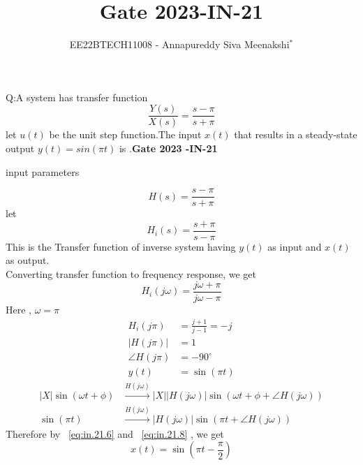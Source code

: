 \documentclass[journal,12pt,twocolumn]{IEEEtran}
\newcommand{\system}[1]{\stackrel{#1}{\rightarrow}}
\theoremstyle{remark}
\begin{document}

\vspace{3cm}

\title{Gate 2023-IN-21}
\author{EE22BTECH11008 - Annapureddy Siva Meenakshi$^{*}$%
}
\maketitle
\bigskip

\renewcommand{\thefigure}{\theenumi}
\renewcommand{\thetable}{\theenumi}
Q:A system has transfer function
 \[\frac{Y(s)}{X(s)}=\frac {s-\pi}{s+\pi}\]
 let $u(t)$ be the unit step function.The input $x(t)$ that results in a steady-state output $y(t)=sin(\pi t)$ is \underline{\quad}.\quad \textbf{Gate 2023 -IN-21}\\
\solution
\begin{table}[!ht]
    \centering
        
    \caption{input parameters}
    \label{tab:in_21_t1}
\end{table}
 \begin{equation}
     H(s)=\frac{s-\pi}{s+\pi}
 \end{equation} 
 let 
 \begin{equation}
     H_i(s)=\frac{s+\pi}{s-\pi}
 \end{equation} 
 This is the Transfer function of inverse system having $y(t)$ as input and $x(t)$ as output.\\
 Converting transfer function to frequency response, we get
 \begin{equation}
     H_i(j\omega)=\frac{j\omega+\pi}{j\omega-\pi}
 \end{equation}
 Here , $\omega=\pi$
 \begin{align}
    H_i(j\pi)&=\frac{j+1}{j-1}=-j\\
     |H(j\pi)|&=1\\
    \angle H(j\pi)&=-90^\circ\\
    y(t)&=\sin(\pi t)\label{eq:in.21.6} 
\end{align}
\begin{align}
  |X|\sin(\omega t+\phi)&\system{H(j\omega)}|X||H(j\omega)|\sin(\omega t +\phi +\angle H(j\omega))\label{eq:in.21.7}\\
  \sin(\pi t)&\system{H(j\omega)}|H(j\omega)|\sin\left(\pi t  +\angle H(j\omega)\right)\label{eq:in.21.8}
\end{align}
Therefore by ~\eqref{eq:in.21.6} and ~\eqref{eq:in.21.8} , we get
\begin{equation}
    x(t)=\sin\left(\pi t -\frac{\pi}{2}\right)
\end{equation}
\end{document}

